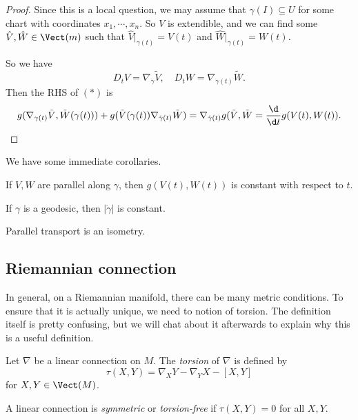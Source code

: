 \documentclass[a4paper]{article}
\begin{document}
\begin{proof}
  Since this is a local question, we may assume that $\gamma(I) \subseteq U$ for some chart with coordinates $x_1, \cdots, x_n$. So $V$ is extendible, and we can find some $\hat{V}, \hat{W} \in \Vect(m)$ such that $\hat{V}|_{\gamma(t)} = V(t)$ and $\hat{W}|_{\gamma(t)} = W(t)$.

  So we have
  \[
    D_t V = \nabla_{\dot{\gamma}} \tilde{V}, \quad D_t W = \nabla_{\dot{\gamma}(t)} \tilde{W}.
  \]
  Then the RHS of $(*)$ is
  \[
    g(\nabla_{\gamma(t)} \tilde{V}, \tilde{W} (\gamma(t))) + g(\tilde{V}(\gamma(t)) \nabla_{\dot{\gamma}(t)} \tilde{W}) = \nabla_{\dot{\gamma}(t)} g(\tilde{V}, \tilde{W} = \frac{\d}{\d t} g(V(t), W(t)).
  \]
\end{proof}

We have some immediate corollaries.
\begin{cor}
  If $V, W$ are parallel along $\gamma$, then $g(V(t), W(t))$ is constant with respect to $t$.
\end{cor}

\begin{cor}
  If $\gamma$ is a geodesic, then $|\dot{\gamma}|$ is constant.
\end{cor}

\begin{cor}
  Parallel transport is an isometry.
\end{cor}

\subsection{Riemannian connection}
In general, on a Riemannian manifold, there can be many metric conditions. To ensure that it is actually unique, we need to notion of torsion. The definition itself is pretty confusing, but we will chat about it afterwards to explain why this is a useful definition.

\begin{defi}
  Let $\nabla$ be a linear connection on $M$. The \emph{torsion} of $\nabla$ is defined by
  \[
    \tau(X, Y) = \nabla_X Y - \nabla_Y X - [X, Y]
  \]
  for $X, Y \in \Vect(M)$.
\end{defi}

\begin{defi}
  A linear connection is \emph{symmetric} or \emph{torsion-free} if $\tau(X, Y) = 0$ for all $X, Y$.
\end{defi}
\end{document}
